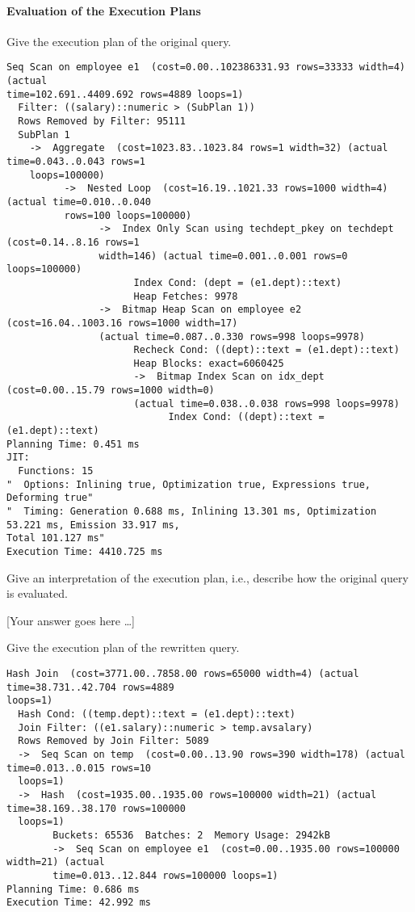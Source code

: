 \documentclass[11pt]{scrartcl}
\newcommand{\youranswerhere}{[Your answer goes here \ldots]}
\begin{document}
    \paragraph{Evaluation of the Execution Plans}

    Give the execution plan of the original query.

            {\small
    \parskip0pt\begin{verbatim}
Seq Scan on employee e1  (cost=0.00..102386331.93 rows=33333 width=4) (actual 
time=102.691..4409.692 rows=4889 loops=1)
  Filter: ((salary)::numeric > (SubPlan 1))
  Rows Removed by Filter: 95111
  SubPlan 1
    ->  Aggregate  (cost=1023.83..1023.84 rows=1 width=32) (actual time=0.043..0.043 rows=1 
    loops=100000)
          ->  Nested Loop  (cost=16.19..1021.33 rows=1000 width=4) (actual time=0.010..0.040 
          rows=100 loops=100000)
                ->  Index Only Scan using techdept_pkey on techdept  (cost=0.14..8.16 rows=1 
                width=146) (actual time=0.001..0.001 rows=0 loops=100000)
                      Index Cond: (dept = (e1.dept)::text)
                      Heap Fetches: 9978
                ->  Bitmap Heap Scan on employee e2  (cost=16.04..1003.16 rows=1000 width=17) 
                (actual time=0.087..0.330 rows=998 loops=9978)
                      Recheck Cond: ((dept)::text = (e1.dept)::text)
                      Heap Blocks: exact=6060425
                      ->  Bitmap Index Scan on idx_dept  (cost=0.00..15.79 rows=1000 width=0) 
                      (actual time=0.038..0.038 rows=998 loops=9978)
                            Index Cond: ((dept)::text = (e1.dept)::text)
Planning Time: 0.451 ms
JIT:
  Functions: 15
"  Options: Inlining true, Optimization true, Expressions true, Deforming true"
"  Timing: Generation 0.688 ms, Inlining 13.301 ms, Optimization 53.221 ms, Emission 33.917 ms, 
Total 101.127 ms"
Execution Time: 4410.725 ms
    \end{verbatim}}

    Give an interpretation of the execution plan, i.e., describe how the original query is evaluated.

    \youranswerhere{}

    Give the execution plan of the rewritten query.

            {\small
    \parskip0pt\begin{verbatim}
Hash Join  (cost=3771.00..7858.00 rows=65000 width=4) (actual time=38.731..42.704 rows=4889 
loops=1)
  Hash Cond: ((temp.dept)::text = (e1.dept)::text)
  Join Filter: ((e1.salary)::numeric > temp.avsalary)
  Rows Removed by Join Filter: 5089
  ->  Seq Scan on temp  (cost=0.00..13.90 rows=390 width=178) (actual time=0.013..0.015 rows=10 
  loops=1)
  ->  Hash  (cost=1935.00..1935.00 rows=100000 width=21) (actual time=38.169..38.170 rows=100000 
  loops=1)
        Buckets: 65536  Batches: 2  Memory Usage: 2942kB
        ->  Seq Scan on employee e1  (cost=0.00..1935.00 rows=100000 width=21) (actual 
        time=0.013..12.844 rows=100000 loops=1)
Planning Time: 0.686 ms
Execution Time: 42.992 ms
    \end{verbatim}}
\end{document}
